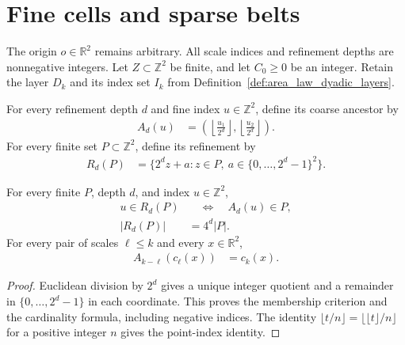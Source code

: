 \section{Fine cells and sparse belts}
\label{sec:area_law_fine_belts}

The origin $o\in\mathbb R^2$ remains arbitrary. All scale indices and
refinement depths are nonnegative integers. Let $Z\subset\mathbb Z^2$ be
finite, and let $C_0\ge0$ be an integer. Retain the layer $D_k$ and its
index set $I_k$ from Definition~\ref{def:area_law_dyadic_layers}.

\begin{definition}
    \label{def:area_law_dyadic_refinement}
    \leanok
    For every refinement depth $d$ and fine index $u\in\mathbb Z^2$, define
    its coarse ancestor by
    \begin{align}
        A_d(u) & =\left(\left\lfloor\frac{u_1}{2^d}\right\rfloor,
        \left\lfloor\frac{u_2}{2^d}\right\rfloor\right).
    \end{align}
    For every finite set $P\subset\mathbb Z^2$, define its refinement by
    \begin{align}
        R_d(P) & =\{2^d z+a:z\in P,\ a\in\{0,\ldots,2^d-1\}^2\}.
    \end{align}
\end{definition}

\begin{lemma}
    \label{thm:area_law_dyadic_refinement}
    \leanok
    For every finite $P$, depth $d$, and index $u\in\mathbb Z^2$,
    \begin{align}
        u\in R_d(P) & \quad\Longleftrightarrow\quad A_d(u)\in P, \\
        |R_d(P)|    & =4^d|P|.
    \end{align}
    For every pair of scales $\ell\le k$ and every $x\in\mathbb R^2$,
    \begin{align}
        A_{k-\ell}(c_\ell(x)) & =c_k(x).
    \end{align}
\end{lemma}
\begin{proof}\leanok
    Euclidean division by $2^d$ gives a unique integer quotient and a
    remainder in $\{0,\ldots,2^d-1\}$ in each coordinate. This proves the
    membership criterion and the cardinality formula, including negative
    indices. The identity $\lfloor t/n\rfloor=\lfloor\lfloor t\rfloor/n\rfloor$
    for a positive integer $n$ gives the point-index identity.
\end{proof}

